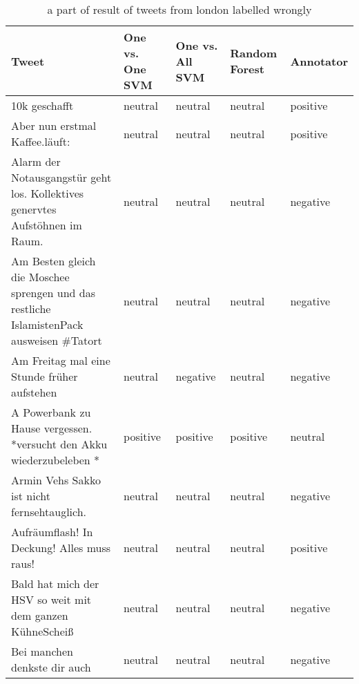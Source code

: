 \begin{table}[ht]
	\caption{a part of result of tweets from london labelled wrongly}
	\begin{tabular}{|p{5cm}|p{1.8cm}|p{1.8cm}|p{1.8cm}|p{1.8cm}|} \hline
	Tweet & One vs. One SVM &One vs. All SVM &Random Forest & Annotator\\ \hline

	10k geschafft &neutral &neutral&neutral&positive\\ \hline
	Aber nun erstmal Kaffee.l\"auft:&neutral&neutral&neutral&positive\\ \hline
	Alarm der Notausgangst\"ur geht los. Kollektives genervtes Aufst\"ohnen im Raum. &neutral&neutral&neutral&negative \\ \hline
	Am Besten gleich die Moschee sprengen und das restliche IslamistenPack ausweisen \#Tatort &neutral&neutral&neutral&negative\\ \hline
	Am Freitag mal eine Stunde früher aufstehen &neutral&negative&neutral&negative\\ \hline
	
	A Powerbank zu Hause vergessen. *versucht den Akku wiederzubeleben *&positive&positive&positive&neutral \\ \hline
	Armin Vehs Sakko ist nicht fernsehtauglich.&neutral&neutral&neutral&negative\\ \hline
	Aufr\"aumflash! In Deckung! Alles muss raus!&neutral&neutral&neutral&positive \\ \hline
	Bald hat mich der HSV so weit mit dem ganzen KühneSchei{\ss}&neutral&neutral&neutral&negative\\ \hline
	Bei manchen denkste dir auch&neutral&neutral&neutral&negative \\ \hline
	\end{tabular}
	\label{tab:wrong_tweets_de}
\end{table}

\clearpage


